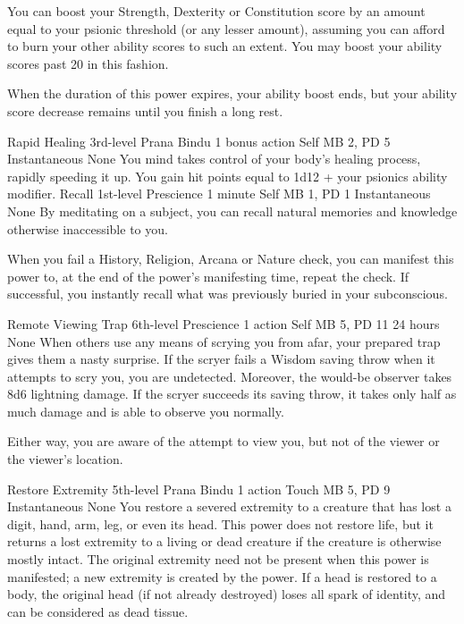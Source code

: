 You can boost your Strength, Dexterity or Constitution score
by an amount equal to your psionic threshold (or any lesser
amount), assuming you can afford to burn your other ability
scores to such an extent. You may boost your ability scores
past 20 in this fashion.

When the duration of this power expires, your ability boost
ends, but your ability score decrease remains until you
finish a long rest.

\DndPowerHeader%
    {Rapid Healing\label{pwr:rapid_healing}}
    {3rd-level Prana Bindu}
    {1 bonus action}
    {Self}
    {MB 2, PD 5}
    {Instantaneous}
    {None}
You mind takes control of your body's healing
process, rapidly speeding it up. You gain hit points equal
to 1d12 + your psionics ability modifier.
\DndPowerHeader%
    {Recall\label{pwr:recall}}
    {1st-level Prescience}
    {1 minute}
    {Self}
    {MB 1, PD 1}
    {Instantaneous}
    {None}
By meditating on a subject, you can recall
natural memories and knowledge otherwise inaccessible to you.

When you fail a History, Religion, Arcana or Nature check,
you can manifest this power to, at the end of the power's
manifesting time, repeat the check. If successful, you instantly
recall what was previously buried in your subconscious.

\DndPowerHeader%
    {Remote Viewing Trap\label{pwr:remote_viewing_trap}}
    {6th-level Prescience}
    {1 action}
    {Self}
    {MB 5, PD 11}
    {24 hours}
    {None}
When others use any means of scrying you
from afar, your prepared trap gives them a nasty surprise.
If the scryer fails a Wisdom saving throw when it attempts
to scry you, you are undetected. Moreover, the would-be observer
takes 8d6 lightning damage. If the scryer succeeds its saving
throw, it takes only half as much damage and is able to observe
you normally.

Either way, you are aware of the attempt to view you, but
not of the viewer or the viewer's location.

\DndPowerHeader%
    {Restore Extremity\label{pwr:restore_extremity}}
    {5th-level Prana Bindu}
    {1 action}
    {Touch}
    {MB 5, PD 9}
    {Instantaneous}
    {None}
You restore a severed extremity to a creature
that has lost a digit, hand, arm, leg, or even its head. This
power does not restore life, but it returns a lost extremity
to a living or dead creature if the creature is otherwise
mostly intact. The original extremity need not be present
when this power is manifested; a new extremity is created
by the power. If a head is restored to a body, the original
head (if not already destroyed) loses all spark of identity,
and can be considered as dead tissue.

